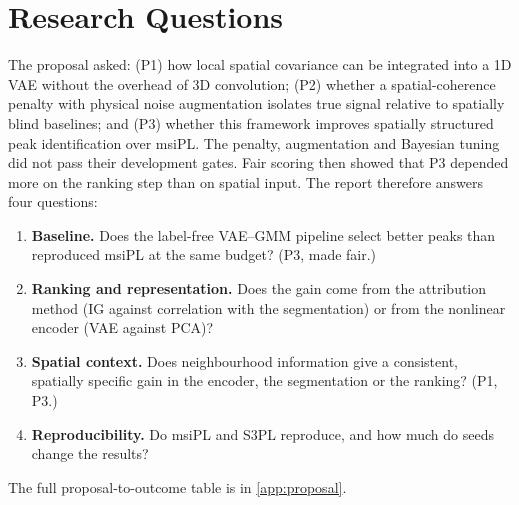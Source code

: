\section{Research Questions}
\label{sec:questions}

The proposal asked:
(P1) how local spatial covariance can be integrated into a 1D VAE without the
overhead of 3D convolution;
(P2) whether a spatial-coherence penalty with physical noise augmentation
isolates true signal relative to spatially blind baselines; and
(P3) whether this framework improves spatially structured peak identification
over msiPL.
The penalty, augmentation and Bayesian tuning did not pass their development
gates. Fair scoring then showed that P3 depended more on the ranking step than
on spatial input. The report therefore answers four questions:
\begin{enumerate}[label=RQ\arabic*.]
  \item \textbf{Baseline.} Does the label-free VAE--GMM pipeline select better
        peaks than reproduced msiPL at the same budget? (P3, made fair.)
  \item \textbf{Ranking and representation.} Does the gain come from the
        attribution method (IG against correlation with the segmentation) or
        from the nonlinear encoder (VAE against PCA)?
  \item \textbf{Spatial context.} Does neighbourhood information give a
        consistent, spatially specific gain in the encoder, the segmentation or
        the ranking? (P1, P3.)
  \item \textbf{Reproducibility.} Do msiPL and S3PL reproduce, and how much do
        seeds change the results?
\end{enumerate}
The full proposal-to-outcome table is in \cref{app:proposal}.
